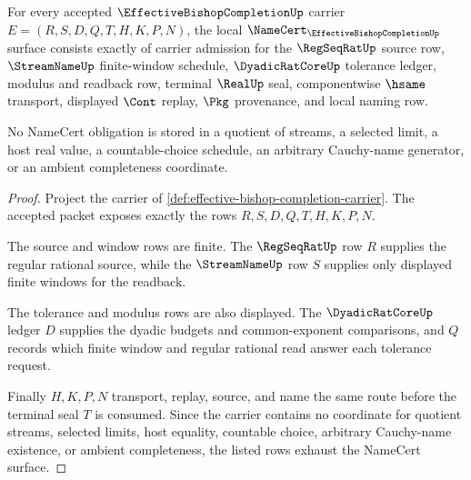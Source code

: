 \begin{theorem}
\label{thm:effective-bishop-completion-namecert-obligations}
For every accepted $\EffectiveBishopCompletionUp$ carrier $E=(R,S,D,Q,T,H,K,P,N)$, the local $\NameCert_{\EffectiveBishopCompletionUp}$ surface consists exactly of carrier admission for the $\RegSeqRatUp$ source row, $\StreamNameUp$ finite-window schedule, $\DyadicRatCoreUp$ tolerance ledger, modulus and readback row, terminal $\RealUp$ seal, componentwise $\hsame$ transport, displayed $\Cont$ replay, $\Pkg$ provenance, and local naming row.

No NameCert obligation is stored in a quotient of streams, a selected limit, a host real value, a countable-choice schedule, an arbitrary Cauchy-name generator, or an ambient completeness coordinate.
\end{theorem}
\begin{proof}
Project the carrier of \autoref{def:effective-bishop-completion-carrier}. The accepted packet exposes exactly the rows $R,S,D,Q,T,H,K,P,N$.

The source and window rows are finite. The $\RegSeqRatUp$ row $R$ supplies the regular rational source, while the $\StreamNameUp$ row $S$ supplies only displayed finite windows for the readback.

The tolerance and modulus rows are also displayed. The $\DyadicRatCoreUp$ ledger $D$ supplies the dyadic budgets and common-exponent comparisons, and $Q$ records which finite window and regular rational read answer each tolerance request.

Finally $H,K,P,N$ transport, replay, source, and name the same route before the terminal seal $T$ is consumed. Since the carrier contains no coordinate for quotient streams, selected limits, host equality, countable choice, arbitrary Cauchy-name existence, or ambient completeness, the listed rows exhaust the NameCert surface.
\end{proof}


